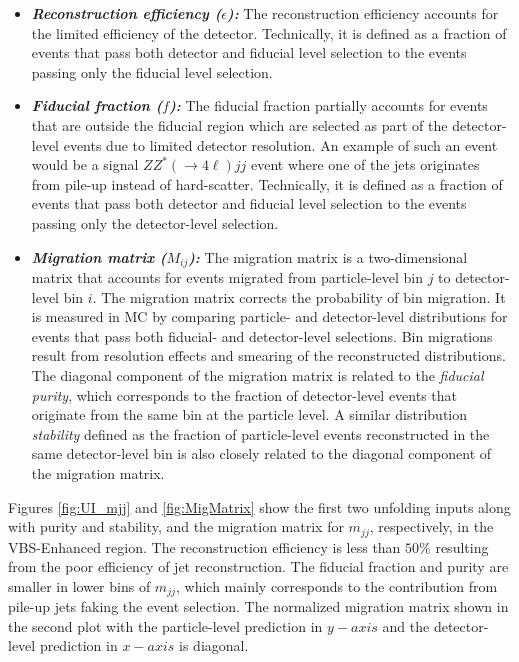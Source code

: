 \begin{itemize}
    \item{\textit{\textbf{Reconstruction efficiency ($\epsilon$):}} The reconstruction efficiency accounts for the limited efficiency of the detector. Technically, it is defined as a fraction of events that pass both detector and fiducial level selection to the events passing only the fiducial level selection. }
    
    \item{\textit{\textbf{Fiducial fraction ($f$):}} The fiducial fraction partially accounts for events that are outside the fiducial region which are selected as part of the detector-level events due to limited detector resolution. An example of such an event would be a signal $ZZ^*(\rightarrow 4\ell) jj$ event where one of the jets originates from pile-up instead of hard-scatter. Technically, it is defined as a fraction of events that pass both detector and fiducial level selection to the events passing only the detector-level selection. }
    
    \item{\textit{\textbf{Migration matrix ($M_{ij}$):}} The migration matrix is a two-dimensional matrix that accounts for events migrated from particle-level bin $j$ to detector-level bin $i$. The migration matrix corrects the probability of bin migration. It is measured in MC by comparing particle- and detector-level distributions for events that pass both fiducial- and detector-level selections. Bin migrations result from resolution effects and smearing of the reconstructed distributions. The diagonal component of the migration matrix is related to the \textit{fiducial purity}, which corresponds to the fraction of detector-level events that originate from the same bin at the particle level. A similar distribution \textit{stability} defined as the fraction of particle-level events reconstructed in the same detector-level bin is also closely related to the diagonal component of the migration matrix. }
\end{itemize}

Figures \ref{fig:UI_mjj} and \ref{fig:MigMatrix} show the first two unfolding inputs along with purity and stability, and the migration matrix for $m_{jj}$, respectively, in the VBS-Enhanced region. The reconstruction efficiency is less than $50\%$ resulting from the poor efficiency of jet reconstruction. The fiducial fraction and purity are smaller in lower bins of $m_{jj}$, which mainly corresponds to the contribution from pile-up jets faking the event selection. The normalized migration matrix shown in the second plot with the particle-level prediction in $y-axis$ and the detector-level prediction in $x-axis$ is diagonal.


